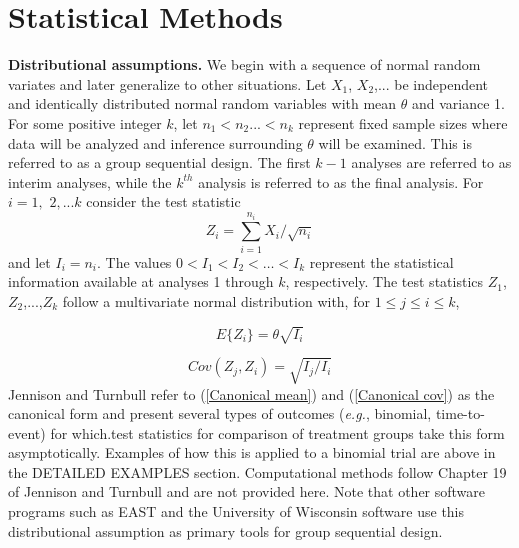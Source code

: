 \section{Statistical Methods\label{sec:statmethods}}

\bigskip

\textbf{Distributional assumptions. }We begin with a sequence of normal random
variates and later generalize to other situations. Let $X_{1}$, $X_{2}%
$,... be independent and identically distributed normal random variables with
mean $\theta$ and variance 1. For some positive integer $k$, let $n_{1}%
<n_{2}...<n_{k}$ represent fixed sample sizes where data will be analyzed and
inference surrounding $\theta$ will be examined. This is referred to as a
group sequential design. The first $k-1$ analyses are referred to as interim
analyses, while the $k^{th}$ analysis is referred to as the final analysis.
For $i=1,$ $2,...k$ consider the test statistic%
\[
Z_{i}=%
{\textstyle\sum\limits_{i=1}^{n_{i}}}
X_{i}/\sqrt{n_{i}}
\]
and let $I_{i}=n_{i}$. The values $0<I_{1}<I_{2}<\ldots<I_{k}$ represent the
statistical information available at analyses 1 through $k$, respectively. The
test statistics $Z_{1}$, $Z_{2}$,...,$Z_{k}$ follow a multivariate normal
distribution with, for $1\leq j\leq i\leq k$,%

\begin{equation}
E\{Z_{i}\}=\theta\sqrt{I_{i}}\label{Canonical mean}%
\end{equation}
%

\begin{equation}
Cov(Z_{j},Z_{i})=\sqrt{I_{j}/I_{i}}\label{Canonical cov}%
\end{equation}
Jennison and Turnbull \cite{JTBook} refer to (\ref{Canonical mean}) and
(\ref{Canonical cov}) as the canonical form and present several types of
outcomes (\textit{e.g.}, binomial, time-to-event) for which.test statistics
for comparison of treatment groups take this form asymptotically. Examples of
how this is applied to a binomial trial are above in the DETAILED EXAMPLES
section. Computational methods follow Chapter 19 of Jennison and Turnbull
\cite{JTBook} and are not provided here. Note that other software programs
such as EAST and the University of Wisconsin software use this distributional
assumption as primary tools for group sequential design.

